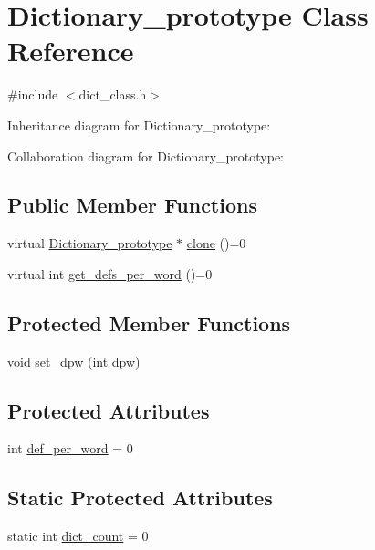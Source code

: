 \hypertarget{class_dictionary__prototype}{}\section{Dictionary\+\_\+prototype Class Reference}
\label{class_dictionary__prototype}


{\ttfamily \#include $<$dict\+\_\+class.\+h$>$}



Inheritance diagram for Dictionary\+\_\+prototype\+:


Collaboration diagram for Dictionary\+\_\+prototype\+:
\subsection*{Public Member Functions}
\begin{DoxyCompactItemize}
\item 
virtual \mbox{\hyperlink{class_dictionary__prototype}{Dictionary\+\_\+prototype}} $\ast$ \mbox{\hyperlink{class_dictionary__prototype_ac06fe410a511be7ee85ba07cf69b9418}{clone}} ()=0
\item 
virtual int \mbox{\hyperlink{class_dictionary__prototype_a4f9e8f9c02d878faac1021f9c31da736}{get\+\_\+defs\+\_\+per\+\_\+word}} ()=0
\end{DoxyCompactItemize}
\subsection*{Protected Member Functions}
\begin{DoxyCompactItemize}
\item 
void \mbox{\hyperlink{class_dictionary__prototype_a324c06690a73ea5bddcc8a34326e55f1}{set\+\_\+dpw}} (int dpw)
\end{DoxyCompactItemize}
\subsection*{Protected Attributes}
\begin{DoxyCompactItemize}
\item 
int \mbox{\hyperlink{class_dictionary__prototype_a39d3ee70ecd5cdbfe77d65599379141a}{def\+\_\+per\+\_\+word}} = 0
\end{DoxyCompactItemize}
\subsection*{Static Protected Attributes}
\begin{DoxyCompactItemize}
\item 
static int \mbox{\hyperlink{class_dictionary__prototype_a1126740256ec9cb1e0115884213b0b57}{dict\+\_\+count}} = 0
\end{DoxyCompactItemize}


